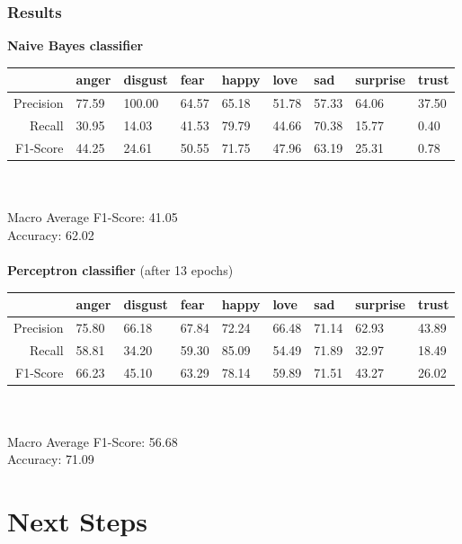 \documentclass[10pt,aspectratio=169]{beamer}
\begin{document}
\begin{frame}
  \frametitle{Results}
  \textbf{Naive Bayes classifier}
  \begin{tabular}{r|llllllll}
              & anger & disgust & fear  & happy & love  & sad   & surprise & trust\\\hline
    Precision & 77.59 & 100.00  & 64.57 & 65.18 & 51.78 & 57.33 & 64.06    & 37.50\\
    Recall    & 30.95 & 14.03   & 41.53 & 79.79 & 44.66 & 70.38 & 15.77    & 0.40\\
    F1-Score  & 44.25 & 24.61   & 50.55 & 71.75 & 47.96 & 63.19 & 25.31    & 0.78\\
  \end{tabular}\\~\\
  Macro Average F1-Score: 41.05\\
  Accuracy: 62.02\\~\\
 
  \textbf{Perceptron classifier} (after 13 epochs)
  \begin{tabular}{r|llllllll}
              & anger & disgust & fear  & happy & love  & sad   & surprise & trust\\\hline
    Precision & 75.80 & 66.18   & 67.84 & 72.24 & 66.48 & 71.14 & 62.93    & 43.89\\
    Recall    & 58.81 & 34.20   & 59.30 & 85.09 & 54.49 & 71.89 & 32.97    & 18.49\\
    F1-Score  & 66.23 & 45.10   & 63.29 & 78.14 & 59.89 & 71.51 & 43.27    & 26.02\\
  \end{tabular}\\~\\

  Macro Average F1-Score: 56.68\\
  Accuracy: 71.09
 
\end{frame}

\section{Next Steps}
\end{document}
